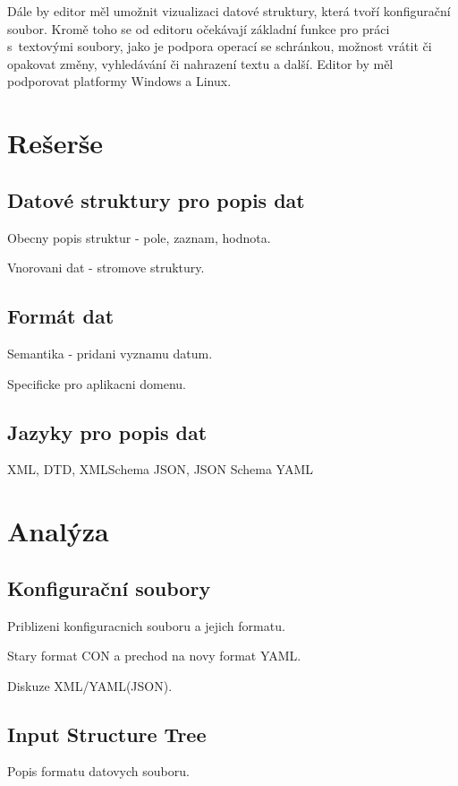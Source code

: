 \documentclass[FM,DP]{tulthesis}
\begin{document}
Dále by editor měl umožnit vizualizaci datové struktury, která tvoří konfigurační soubor. Kromě toho se od editoru očekávají základní funkce pro práci s~textovými soubory, jako je podpora operací se schránkou, možnost vrátit či opakovat změny, vyhledávání či nahrazení textu a další. Editor by měl podporovat platformy Windows a Linux. %



\chapter{Rešerše}

\section{Datové struktury pro popis dat}
Obecny popis struktur - pole, zaznam, hodnota.


Vnorovani dat - stromove struktury.


\section{Formát dat}
Semantika - pridani vyznamu datum.

Specificke pro aplikacni domenu.

\section{Jazyky pro popis dat}
XML, DTD, XMLSchema
JSON, JSON Schema
YAML


\chapter{Analýza}


\section{Konfigurační soubory}
Priblizeni konfiguracnich souboru a jejich formatu.

Stary format CON a prechod na novy format YAML.

Diskuze XML/YAML(JSON). 

\section{Input Structure Tree}
Popis formatu datovych souboru.
\end{document}

